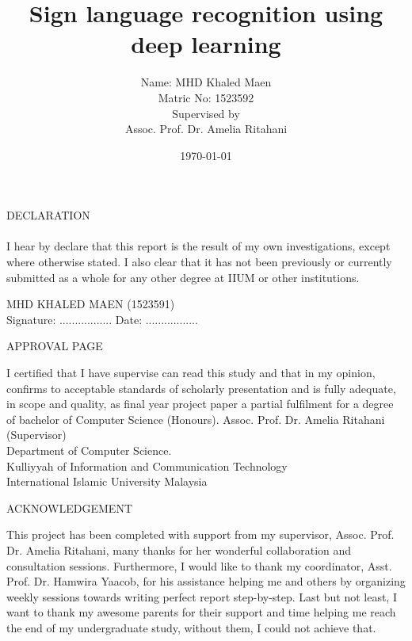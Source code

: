 \documentclass[12pt]{report}
\title{Sign language recognition using deep learning}
\author{ Name: MHD Khaled Maen\\
        Matric No: 1523592 \\ 
        [1.5cm]
        Supervised by\\
        Assoc. Prof. Dr. Amelia Ritahani \\}
\date{\today}
\begin{document}
    \maketitle
    \begin{center}
        \LARGE DECLARATION
    \end{center}        
    \paragraph{}
        I hear by declare that this report is the result of my own investigations,
        except where otherwise stated. I also clear that it 
        has not been previously or currently submitted as a whole for any other degree 
        at IIUM or other institutions.

    \mbox{}
    \vfill
    MHD KHALED MAEN (1523591) \\
    \bigbreak
    Signature: ................. \quad \quad \quad \quad Date: .................
    \bigbreak

    \newpage
    \begin{center}
        \LARGE APPROVAL PAGE
    \end{center}  
    I certified that I have supervise can read this study and that in my opinion,
    confirms to acceptable standards of scholarly presentation and is fully adequate,
    in scope and quality, as final year project paper a partial fulfilment for a 
    degree of bachelor of Computer Science (Honours).
    \mbox{}
    \vfill
    Assoc. Prof. Dr. Amelia Ritahani (Supervisor)\\
    \bigbreak
    Department of Computer Science.\\
    \bigbreak
    Kulliyyah of Information and Communication Technology\\
    \bigbreak
    International Islamic University Malaysia
    \bigbreak

    \newpage

     \begin{center}
        \LARGE ACKNOWLEDGEMENT
    \end{center}  
    This project has been completed with support from my supervisor, Assoc. Prof. Dr. Amelia Ritahani, many thanks for her wonderful 
    collaboration and consultation sessions. Furthermore, 
    I would like to thank my coordinator, Asst. Prof. Dr. Hamwira Yaacob, for his 
    assistance helping me and others by organizing weekly sessions towards writing perfect report step-by-step. 
    Last but not least,
    I want to thank my awesome parents for their support and time helping me reach the end of my undergraduate study, without them, I could not achieve that.
\end{document}
